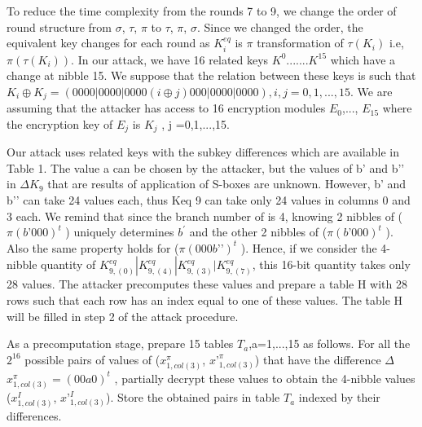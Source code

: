 \documentclass{transcrypto}
\begin{document}
	To reduce the time complexity from the rounds 7 to 9, we change the order of round structure from $\sigma$, $\tau$, $\pi$ to $\tau$, $\pi$, $\sigma$. Since we changed the order, the equivalent key changes for each round as $K_i^{eq}$ is $\pi$ transformation of $\tau (K_i)$ i.e, $\pi (\tau (K_i))$. In our attack, we have 16 related keys $K^{0}$.......$K^{15}$ which have a change at nibble 15. We suppose that the relation between these keys is such that $K_i \oplus K_j =(0000|0000|0000(i \oplus j)000|0000|0000),i, j = 0,1,...,15$. We are assuming that the attacker has access to 16 encryption modules $E_0$,..., $E_15$ where the encryption key of $E_j$ is $K_j$ , j =0,1,...,15.
	
	Our attack uses related keys with the subkey differences which are available in Table 1. The value a can be chosen by the attacker, but the values of b’ and b’’ in $\Delta K_9$ that are results of application of S-boxes are unknown. However, b’ and b’’ can take 24 values each, thus Keq 9 can take only 24 values in columns 0 and 3 each. We remind that since the branch number of is 4, knowing 2 nibbles of ($\pi (b’000)^t$ ) uniquely determines $b^{'}$ and the other 2 nibbles of ($\pi (b’000)^t$ ). Also the same property holds for ($\pi (000b’’)^t$ ). Hence, if we consider the 4-nibble quantity of $K_{9,(0)}^{eq} | K_{9,(4)}^{eq} | K_{9,(3)}^{eq} | K_{9,(7)}^{eq}$, this 16-bit quantity takes only 28 values. The attacker precomputes these values and prepare a table H with 28 rows such that each row has an index equal to one of these values. The table H will be filled in step 2 of the attack procedure. 
	
	As a precomputation stage, prepare 15 tables $T_a$,a=1,...,15 as follows. For all the $2^{16}$ possible pairs of values of ($x_{1,col(3)}^{\pi}$, $x’_{1,col(3)}^{\pi}$) that have the difference $\Delta$ $x_{1,col(3)}^{\pi} =(00a0)^t$ , partially decrypt these values to obtain the 4-nibble values ($x_{1,col(3)}^I$, $x’_{1,col(3)}^I$). Store the obtained pairs in table $T_a$ indexed by their differences. 
	
\end{document}
